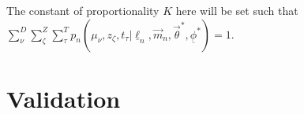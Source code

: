 \documentclass[12pt, onecolumn]{emulateapj}
\newcommand{\textul}{\underline}
\begin{document}
The constant of proportionality $K$ here will be set such that $\sum_{\nu}^{D}\sum_{\zeta}^{Z}\sum_{\tau}^{T} p_{n}(\mu_{\nu}, z_{\zeta}, t_{\tau} | \textul{\ell}_{n}, \vec{m}_{n}, \vec{\theta}^{*}, \textul{\phi}^{*})=1$.



\section{Validation}

%
%
%
%
%
%
%
\end{document}
